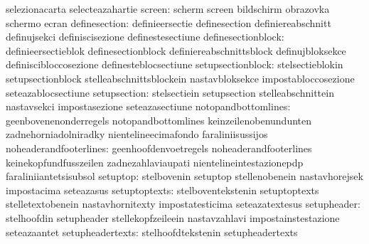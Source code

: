                                   selezionacarta                   selecteazahartie
                          screen: scherm                           screen
                                  bildschirm                       obrazovka
                                  schermo                          ecran
                   definesection: definieersectie                  definesection
                                  definiereabschnitt               definujsekci
                                  definiscisezione                 definestesectiune
              definesectionblock: definieersectieblok              definesectionblock
                                  definiereabschnittsblock         definujbloksekce
                                  definiscibloccosezione           definesteblocsectiune
               setupsectionblock: stelsectieblokin                 setupsectionblock
                                  stelleabschnittsblockein         nastavbloksekce
                                  impostabloccosezione             seteazablocsectiune
                    setupsection: stelsectiein                     setupsection
                                  stelleabschnittein               nastavsekci
                                  impostasezione                   seteazasectiune
             notopandbottomlines: geenbovenenonderregels           notopandbottomlines
                                  keinzeilenobenundunten           zadnehorniadolniradky
                                  nientelineecimafondo             faraliniisussijos
          noheaderandfooterlines: geenhoofdenvoetregels            noheaderandfooterlines
                                  keinekopfundfusszeilen           zadnezahlaviaupati
                                  nientelineintestazionepdp        faraliniiantetsisubsol
                        setuptop: stelbovenin                      setuptop
                                  stellenobenein                   nastavhorejsek
                                  impostacima                      seteazasus
                   setuptoptexts: stelboventekstenin               setuptoptexts
                                  stelletextobenein                nastavhornitexty
                                  impostatesticima                 seteazatextesus
                     setupheader: stelhoofdin                      setupheader
                                  stellekopfzeileein               nastavzahlavi
                                  impostainstestazione             seteazaantet
                setupheadertexts: stelhoofdtekstenin               setupheadertexts
